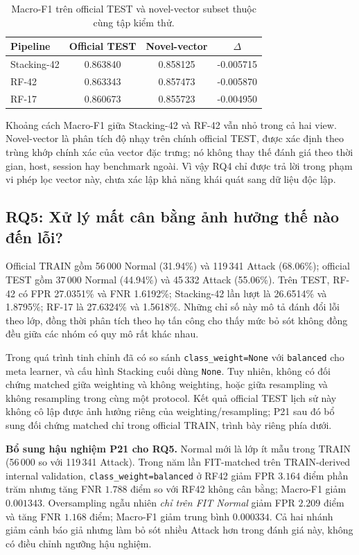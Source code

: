 \begin{table}[htbp]
\centering
\small
\renewcommand{\arraystretch}{1.3}
\setlength{\tabcolsep}{9pt}
\caption{Macro-F1 trên official TEST và novel-vector subset thuộc cùng tập kiểm thử.}
\label{tab:rev-rq4}
\begin{tabularx}{\linewidth}{X S[table-format=1.6] S[table-format=1.6] S[table-format=+1.6]}
\toprule
Pipeline & {Official TEST} & {Novel-vector} & {$\Delta$}\\
\midrule
Stacking-42 & 0.863840 & 0.858125 & -0.005715\\
RF-42 & 0.863343 & 0.857473 & -0.005870\\
RF-17 & 0.860673 & 0.855723 & -0.004950\\
\bottomrule
\end{tabularx}
\end{table}

Khoảng cách Macro-F1 giữa Stacking-42 và RF-42 vẫn nhỏ trong cả hai view. Novel-vector là phân tích độ nhạy trên chính official TEST, được xác định theo trùng khớp chính xác của vector đặc trưng; nó không thay thế đánh giá theo thời gian, host, session hay benchmark ngoài. Vì vậy RQ4 chỉ được trả lời trong phạm vi phép lọc vector này, chưa xác lập khả năng khái quát sang dữ liệu độc lập.

\subsection{RQ5: Xử lý mất cân bằng ảnh hưởng thế nào đến lỗi?}
\label{sec:revision-rq5}
Official TRAIN gồm 56\,000 Normal (31.94\%) và 119\,341 Attack (68.06\%); official TEST gồm 37\,000 Normal (44.94\%) và 45\,332 Attack (55.06\%). Trên TEST, RF-42 có FPR 27.0351\% và FNR 1.6192\%; Stacking-42 lần lượt là 26.6514\% và 1.8795\%; RF-17 là 27.6324\% và 1.5618\%. Những chỉ số này mô tả đánh đổi lỗi theo lớp, đồng thời phân tích theo họ tấn công cho thấy mức bỏ sót không đồng đều giữa các nhóm có quy mô rất khác nhau.

Trong quá trình tinh chỉnh đã có so sánh \texttt{class\_weight=None} với \texttt{balanced} cho meta learner, và cấu hình Stacking cuối dùng \texttt{None}. Tuy nhiên, không có đối chứng matched giữa weighting và không weighting, hoặc giữa resampling và không resampling trong cùng một protocol. Kết quả official TEST lịch sử này không cô lập được ảnh hưởng riêng của weighting/resampling; P21 sau đó bổ sung đối chứng matched chỉ trong official TRAIN, trình bày riêng phía dưới.

\noindent\textbf{Bổ sung hậu nghiệm P21 cho RQ5.}
Normal mới là lớp ít mẫu trong TRAIN (56\,000 so với 119\,341 Attack). Trong năm lần FIT-matched trên TRAIN-derived internal validation, \texttt{class\_weight=balanced} ở RF42 giảm FPR $3.164$ điểm phần trăm nhưng tăng FNR $1.788$ điểm so với RF42 không cân bằng; Macro-F1 giảm $0.001343$. Oversampling ngẫu nhiên \emph{chỉ trên FIT Normal} giảm FPR $2.209$ điểm và tăng FNR $1.168$ điểm; Macro-F1 giảm trung bình $0.000334$. Cả hai nhánh giảm cảnh báo giả nhưng làm bỏ sót nhiều Attack hơn trong đánh giá này, không có điều chỉnh ngưỡng hậu nghiệm.

